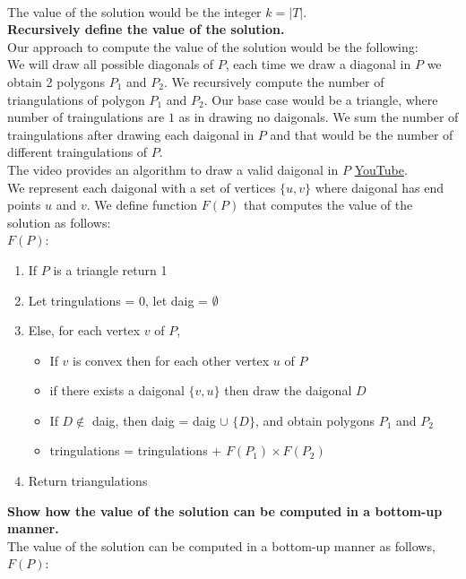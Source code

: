 \documentclass[addpoints,a4paper]{exam}
\begin{document}
\begin{questions}
\begin{solution}
\begin{parts}
			\\The value of the solution would be the integer $k = |T|$.
			\\\textbf{Recursively define the value of the solution.}
			\\Our approach to compute the value of the solution would be the following:
			\\We will draw all possible diagonals of $P$, each time we draw a diagonal in $P$ we obtain 2 polygons $P_1$ and $P_2$. 
			We recursively compute the number of triangulations of polygon $P_1$ and $P_2$. Our base case would be a triangle, where number of traingulations are $1$ as in drawing no daigonals.
			We sum the number of traingulations after drawing each daigonal in $P$ and that would be the number of different traingulations of $P$.
			\\The video provides an algorithm to draw a valid daigonal in $P$ \href{https://www.youtube.com/watch?v=2x4ioToqe_c}{YouTube}. 
			\\We represent each daigonal with a set of vertices $\{u,v\}$ where daigonal has end points $u$ and $v$. We define function $F(P)$ that computes the value of the solution as follows:
			\\$F(P):$
				\begin{enumerate}
					\item If $P$ is a triangle return 1
					\item Let tringulations = 0, let daig = $\emptyset$
					\item Else, for each vertex $v$ of $P$,
					      \begin{itemize}
						      \item If $v$ is convex then for each other vertex $u$ of $P$
						      \item if there exists a daigonal $\{v,u\}$ then draw the daigonal $D$
						      \item If $D\not\in$ daig, then daig = daig $\cup$ $\{D\}$, and obtain polygons $P_1$ and $P_2$
						      \item tringulations = tringulations + $F(P_1) \times F(P_2)$
					      \end{itemize}
					\item Return triangulations
				\end{enumerate}
				\textbf{Show how the value of the solution can be computed in a bottom-up manner.}
				\\The value of the solution can be computed in a bottom-up manner as follows,
				\\$F(P):$

\end{parts}
\end{solution}
\end{questions}
\end{document}

